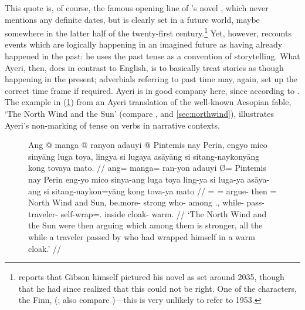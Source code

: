 This quote is, of course, the famous opening line of
\citeauthor{gibson:neuromancer}'s 
novel , which never mentions any definite dates,
but is clearly set in a future world, maybe somewhere in the latter half of the
twenty-first century.\footnote{\citet{christian2017} reports that Gibson
himself pictured his novel as set around 2035, though that he had since
realized that this could not be right. One of the characters, the Finn,
(\cite{christian2017}; also compare \cite[Ch.~5]{gibson:neuromancer})---this is
very unlikely to refer to 1953.} Yet, however, \citeauthor{gibson:neuromancer}
recounts events which are logically happening in an imagined future as having
already happened in the past: he uses the past tense as a convention of
storytelling. What Ayeri, then, does in contrast to English, is to basically
treat stories as though happening in the present; adverbials referring to past
time may, again, set up the correct time frame if required. Ayeri is in good
company here, since according to \citet{dahl1985}
. The example in (\ref{ex:nonarrpst}) from an
Ayeri translation of the well-known Aesopian fable, `The North Wind and the
Sun' (compare \cite[39]{ipa2007}, and \autoref{sec:northwind}), illustrates
Ayeri's non-marking of tense on verbs in narrative contexts.

\begin{figure}
\ex\label{ex:nonarrpst}
\begingl
	\gla Ang @ manga @ ranyon adauyi {} @ Pintemis nay Perin, engyo mico 
		sinyāng luga toya, lingya si lugaya asāyāng si sitang-naykonyāng 
		kong tovaya mato. //
	\glb ang= manga= ran-yon adauyi Ø= Pintemis nay Perin eng-yo mico 
		sinya-ang luga toya ling-ya si luga-ya asāya-ang si 
		sitang-naykon=yāng kong tova-ya mato //
	\glc \AgtT{}= \Prog{}= argue-\TplN{} then \Top{}= {North Wind} and 
		Sun, be.more-\TsgN{} strong who-\Aarg{} among \TplN{}.\Loc{},
		while-\Loc{} \Rel{} pass-\TsgM{} traveler-\Aarg{} \Rel{}
		self-wrap=\TsgM{}.\Aarg{} inside cloak-\Loc{} warm. //
	\glft `The North Wind and the Sun were then arguing which among them is 
		stronger, all the while a traveler passed by who had wrapped 
		himself in a warm cloak.' //
\endgl
\xe
\end{figure}

